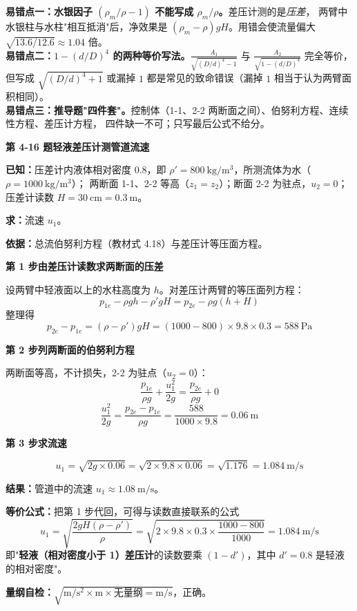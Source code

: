 \begin{yicuo}
\textbf{易错点一：水银因子 $(\rho_m/\rho-1)$ 不能写成 $\rho_m/\rho$。}差压计测的是\emph{压差}，
两臂中水银柱与水柱"相互抵消"后，净效果是 $(\rho_m-\rho)gH$。用错会使流量偏大 $\sqrt{13.6/12.6}\approx1.04$ 倍。\\
\textbf{易错点二：$1-(d/D)^4$ 的两种等价写法。}$\frac{A_1}{\sqrt{(D/d)^4-1}}$ 与 $\frac{A_2}{\sqrt{1-(d/D)^4}}$ 完全等价，
但写成 $\sqrt{(D/d)^4+1}$ 或漏掉 $1$ 都是常见的致命错误（漏掉 $1$ 相当于认为两臂面积相同）。\\
\textbf{易错点三：推导题"四件套"。}控制体（1-1、2-2 两断面之间）、伯努利方程、连续性方程、差压计方程，
四件缺一不可；只写最后公式不给分。
\end{yicuo}

\noindent\textbf{第 4-16 题\quad 轻液差压计测管道流速}

\begin{jie}
\textbf{已知：}压差计内液体相对密度 $0.8$，即 $\rho'=800\ \mathrm{kg/m^3}$，所测流体为水（$\rho=1000\ \mathrm{kg/m^3}$）；
两断面 1-1、2-2 等高（$z_1=z_2$）；断面 2-2 为驻点，$u_2=0$；压差计读数 $H=30\ \mathrm{cm}=0.3\ \mathrm{m}$。

\textbf{求：}流速 $u_1$。

\textbf{依据：}总流伯努利方程（教材式 4.18）与差压计等压面方程。

\textbf{第 1 步\quad 由差压计读数求两断面的压差}

设两臂中轻液面以上的水柱高度为 $h$。对差压计两臂的等压面列方程：
\[ p_{1e}-\rho g h-\rho'gH=p_{2e}-\rho g(h+H) \]
整理得
\[ p_{2e}-p_{1e}=(\rho-\rho')gH=(1000-800)\times9.8\times0.3=588\ \mathrm{Pa} \]

\textbf{第 2 步\quad 列两断面的伯努利方程}

两断面等高，不计损失，2-2 为驻点（$u_2=0$）：
\[ \frac{p_{1e}}{\rho g}+\frac{u_1^2}{2g}=\frac{p_{2e}}{\rho g}+0 \]
\[ \frac{u_1^2}{2g}=\frac{p_{2e}-p_{1e}}{\rho g}=\frac{588}{1000\times9.8}=0.06\ \mathrm{m} \]

\textbf{第 3 步\quad 求流速}

\[ u_1=\sqrt{2g\times0.06}=\sqrt{2\times9.8\times0.06}=\sqrt{1.176}=1.084\ \mathrm{m/s} \]

\textbf{结果：}管道中的流速 $u_1\approx1.08\ \mathrm{m/s}$。

\textbf{等价公式：}把第 1 步代回，可得与读数直接联系的公式
\[ u_1=\sqrt{\frac{2gH(\rho-\rho')}{\rho}}=\sqrt{2\times9.8\times0.3\times\frac{1000-800}{1000}}=1.084\ \mathrm{m/s} \]
即"\textbf{轻液（相对密度小于 1）差压计}的读数要乘 $(1-d')$，其中 $d'=0.8$ 是轻液的相对密度"。

\textbf{量纲自检：}$\sqrt{\mathrm{m/s^2\times m\times\text{无量纲}}=\mathrm{m/s}}$，正确。
\end{jie}


